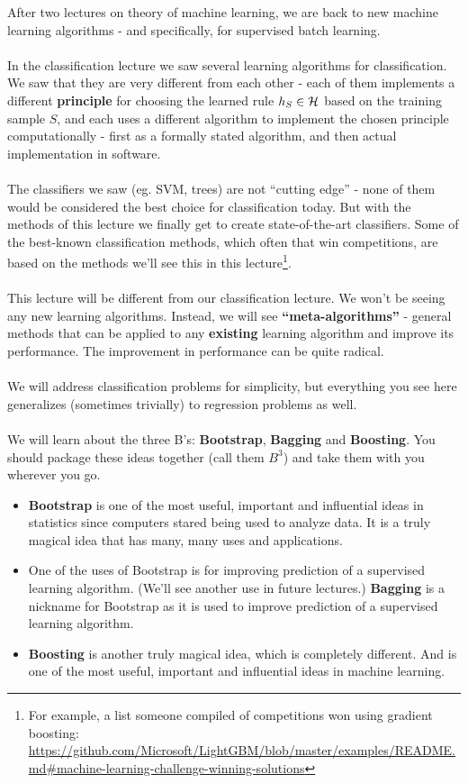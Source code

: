 After two lectures on theory of machine learning, we are back to new
machine learning algorithms - and specifically, 
for supervised batch learning. 
\\~\\
In the classification lecture we saw several learning algorithms for
classification. We saw that they are very different from each other - each of
them implements
a different {\bf principle} for choosing the learned rule $h_S\in\mathcal{H}$ based on the
training sample $S$, and each uses a different algorithm to implement the chosen
principle computationally - first as a formally stated algorithm, and then
actual implementation in software.
\\~\\
The classifiers we saw (eg. SVM, trees) are not ``cutting edge'' - none of them
would be considered the best choice for classification today.
%
But with the methods
of this lecture we finally get to create state-of-the-art classifiers. 
Some of the best-known
classification methods, which often that win competitions, are based on the
methods we'll see this in this lecture\footnote{For example, a list someone compiled of competitions won using
  gradient boosting: 
\url{https://github.com/Microsoft/LightGBM/blob/master/examples/README.md\#machine-learning-challenge-winning-solutions}}.
\\~\\
This lecture will be different from our classification lecture. We won't
be seeing any new learning algorithms. Instead, we will see {\bf
``meta-algorithms''}
- general methods that can be applied to any {\bf existing} learning algorithm and
improve its performance. The improvement in performance can be quite
radical. 
\\~\\
We will address classification problems for simplicity, but everything you see
here generalizes (sometimes trivially) to regression problems as well.
\\~\\  
We will learn about the three B's: {\bf Bootstrap}, {\bf Bagging} and {\bf
Boosting}. You should package these ideas together (call them $B^3$) and take
them with you wherever you go.
\begin{itemize}
  \item {\bf Bootstrap} is one of the most useful, important and influential
    ideas in statistics since computers stared being used to analyze data. It
    is  a truly magical idea that has many, many uses and applications. 
  \item One of the uses of Bootstrap is for improving prediction of a supervised
    learning algorithm. (We'll see another use in future lectures.) 
    {\bf Bagging} is a nickname for Bootstrap as it is used to improve
    prediction of a supervised
    learning algorithm.
  \item  {\bf Boosting} is another truly magical idea, which is completely
    different. And is one of the most useful,
important and influential ideas in machine learning. 
\end{itemize}
